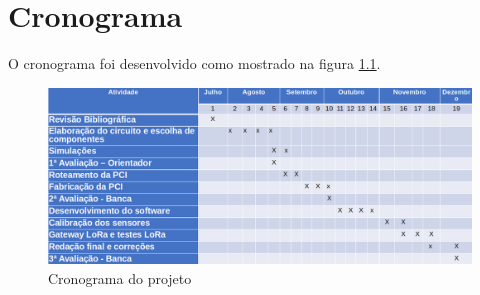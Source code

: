 \chapter{Cronograma} \label{chapter:cronograma}

O cronograma foi desenvolvido como mostrado na figura \ref{figcrono}.

\begin{figure}
  \includegraphics[width=\linewidth]{img/crono.png}
  \caption{Cronograma do projeto}
  \label{figcrono}
\end{figure}


